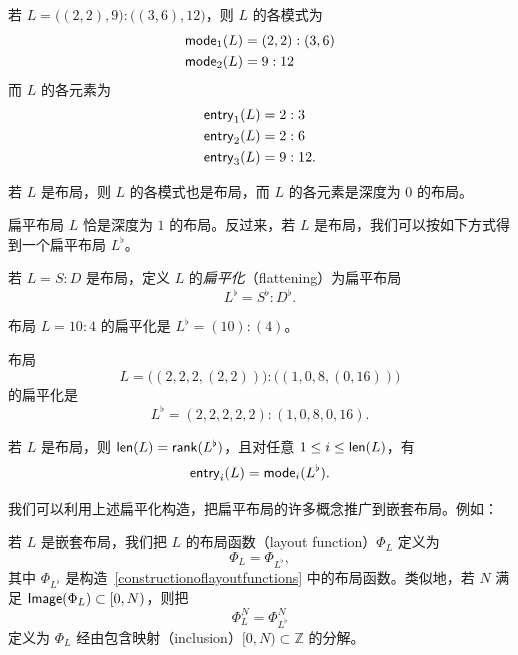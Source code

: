 \begin{example}
    若 $L = \bigl((2,2),9\bigr):\bigl((3,6),12\bigr)$，则 $L$ 的各模式为
    \begin{align*}
        \mathsf{mode}_1(L) & = (2,2):(3,6) \\
        \mathsf{mode}_2(L) & = 9 : 12
    \end{align*}
    而 $L$ 的各元素为
    \begin{align*}
    \mathsf{entry}_1(L) & = 2:3\\
      \mathsf{entry}_2(L) &=  2:6\\
      \mathsf{entry}_3(L)&=   9:12 .
    \end{align*}
\end{example}

\begin{remark}
    若 $L$ 是布局，则 $L$ 的各模式也是布局，而 $L$ 的各元素是深度为 $0$ 的布局。
\end{remark}

\begin{remark}
扁平布局 $L$ 恰是深度为 $1$ 的布局。反过来，若 $L$ 是布局，我们可以按如下方式得到一个扁平布局 $L^\flat$。
\end{remark}


\begin{definition}
    若 $L = S:D$ 是布局，定义 $L$ 的{\it 扁平化}（flattening）为扁平布局
    \[
    L^\flat = S^\flat : D^\flat.
    \]
\end{definition}

\begin{example}
    布局 $L = 10:4$ 的扁平化是 $L^\flat = (10):(4)$。
\end{example}

\begin{example}
布局
    \[
    L = \bigl((2,2,2,(2,2))\bigr) : \bigl((1,0,8,(0,16))\bigr)
    \]
    的扁平化是
    \[
    L^\flat = (2,2,2,2,2) : (1,0,8,0,16).
    \]
\end{example}

\begin{remark}
    若 $L$ 是布局，则 $\mathsf{len}(L) = \mathsf{rank}(L^\flat)$，且对任意 $1 \leq i \leq \mathsf{len}(L)$，有
    \[\mathsf{entry}_i(L) = \mathsf{mode}_i(L^\flat).\]
\end{remark}

\noindent 我们可以利用上述扁平化构造，把扁平布局的许多概念推广到嵌套布局。例如：

\begin{construction}[布局函数]
    若 $L$ 是嵌套布局，我们把 $L$ 的布局函数（layout function）$\Phi_L$ 定义为
    \[
    \Phi_L = \Phi_{L^\flat},
    \]
    其中 $\Phi_{L^\flat}$ 是构造~\ref{constructionoflayoutfunctions} 中的布局函数。类似地，若 $N$ 满足 $\mathsf{Image}(\Phi_L) \subset [0,N)$，则把
    \[
    \Phi_L^N = \Phi_{L^\flat}^N
    \]
    定义为 $\Phi_L$ 经由包含映射（inclusion）$[0,N) \subset \mathbb{Z}$ 的分解。
\end{construction}

